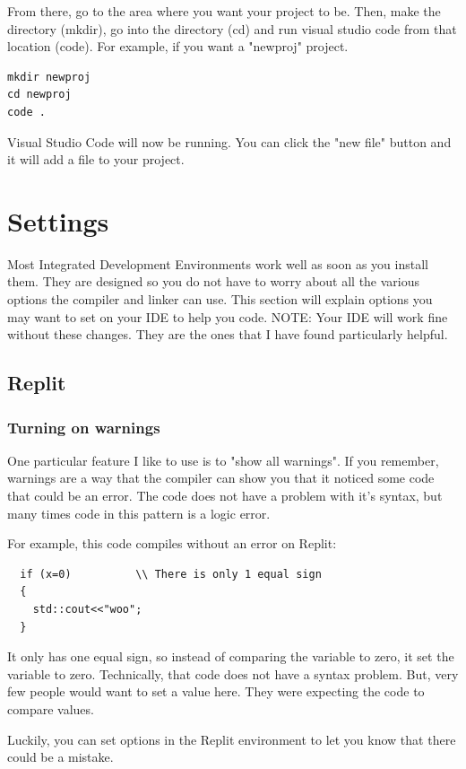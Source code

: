 From there, go to the area where you want your project to be. Then, make the directory (mkdir), go into the directory (cd) and run visual studio code from that location (code). For example, if you want a "newproj" project.

\begin{verbatim}
mkdir newproj
cd newproj
code .    
\end{verbatim}

Visual Studio Code will now be running. You can click the "new file" button and it will add a file to your project.

\section{Settings}
Most Integrated Development Environments work well as soon as you install them. They are designed so you do not have to worry about all the various options the compiler and linker can use. This section will explain options you may want to set on your IDE to help you code. NOTE: Your IDE will work fine without these changes. They are the ones that I have found particularly helpful.
\subsection{Replit}
\subsubsection{Turning on warnings}
\label{showwarning}
One particular feature I like to use is to "show all warnings". If you remember, warnings are a way that the compiler can show you that it noticed some code that could be an error. The code does not have a problem with it's syntax, but many times code in this pattern is a logic error.

For example, this code compiles without an error on Replit:
\begin{lstlisting}
  if (x=0)          \\ There is only 1 equal sign
  {
    std::cout<<"woo";
  }
\end{lstlisting}
It only has one equal sign, so instead of comparing the variable
to zero, it set the variable to zero. Technically, that code does not have a syntax problem. But, very few people would want to set a value here. They were expecting the code to compare values.

Luckily, you can set options in the Replit environment to let you know that there could be a mistake.

